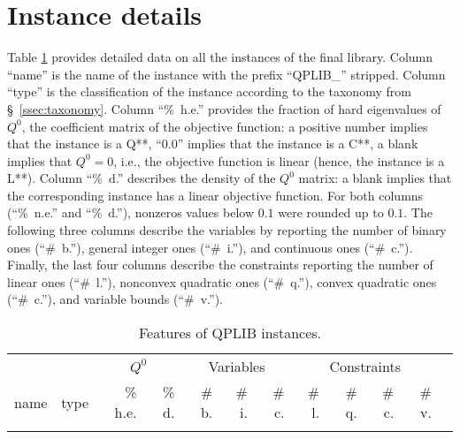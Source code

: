 
\section{Instance details}\label{sec:instance_details}


Table \ref{tab:A1} provides detailed data on all the instances of the final library.
Column ``name'' is the name of the instance with the prefix ``QPLIB\_'' stripped.
Column ``type'' is the classification of the instance according to the taxonomy from \S~\ref{ssec:taxonomy}.
Column ``\%~h.e.'' provides the fraction of hard eigenvalues of $Q^0$, the coefficient matrix of the objective function: a positive number implies that the instance is a Q**, ``0.0'' implies that the instance is a C**, a blank implies that $Q^0 = 0$, i.e., the objective function is linear (hence, the instance is a L**).
Column ``\%~d.'' describes the density of the $Q^0$ matrix: a blank implies that the corresponding instance has a linear objective function.
For both columns (``\%~n.e.'' and ``\%~d.''), nonzeros values below $0.1$ were rounded up to $0.1$.
The following three columns describe the variables by reporting the number of binary ones (``\#~b.''), general integer ones (``\#~i.''), and continuous ones (``\#~c.''). Finally, the last four columns describe the constraints reporting the number of linear ones (``\#~l.''), nonconvex quadratic ones (``\#~q.''), convex quadratic ones (``\#~c.''), and variable bounds (``\#~v.''). 



{\tiny
\centering
\begin{longtable}{llrrrrrrrrrr}
\caption{Features of QPLIB instances.} \\
\toprule

& & \multicolumn{2}{c}{$Q^0$} & \multicolumn{3}{c}{Variables} & \multicolumn{4}{c}{Constraints} \\
\cmidrule(lr){3-4} \cmidrule(lr){5-7} \cmidrule(lr){8-11}
name & type & \% h.e. & \% d. & \# b. & \# i. & \# c. & \# l. & \# q. & \# c. & \# v. \\
\midrule
\endhead 														



\bottomrule
\label{tab:A1}
\end{longtable}

}




